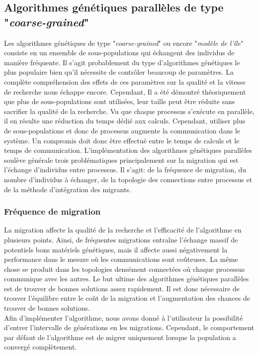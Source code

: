 \documentclass[12pt,a4paper]{article}
\begin{document}
	\newpage	
	
	\subsection{Algorithmes génétiques parallèles de type "\emph{coarse-grained}"}
	Les algorithmes génétiques de type "\emph{coarse-grained}" ou encore "\emph{modèle de l'île}" consiste en un ensemble de sous-populations qui échangent des individus de manière fréquente. Il s'agit probablement du type d'algorithmes génétiques le plus populaire bien qu'il nécessite de contrôler beaucoup de paramètres. La complète compréhension des effets de ces paramètres sur la qualité et la vitesse de recherche nous échappe encore. Cependant, Il a été démontré théoriquement que plus de sous-populations sont utilisées, leur taille peut être réduite sans sacrifier la qualité de la recherche. Vu que chaque processus s'exécute en parallèle, il en résulte une réduction du temps dédié aux calculs. Cependant, utiliser plus de sous-populations et donc de processus augmente la communication dans le système. Un compromis doit donc être effectué entre le temps de calculs et le temps de communication. L'implémentation des algorithmes génétiques parallèles soulève générale trois problématiques principalement sur la migration qui est l'échange d'individus entre processus. Il s'agit: de la fréquence de migration, du nombre d'individus à échanger, de la topologie des connections entre processus et de la méthode d'intégration des migrants.
	\subsubsection{Fréquence de migration}
	La migration affecte la qualité de la recherche et l'efficacité de l'algorithme en plusieurs points. Ainsi, de fréquentes migrations entraîne l'échange massif de potentiels bons matériels génétiques, mais il affecte aussi négativement la performance dans le mesure où les communications sont coûteuses. La même chose se produit dans les topologies densément connectées où chaque processus communique avec les autres. Le but ultime des algorithmes génétiques parallèles est de trouver de bonnes solutions assez rapidement. Il est donc nécessaire de trouver l'équilibre entre le coût de la migration et l'augmentation des chances de trouver de bonnes solutions. \\
	\hspace*{.5cm} Afin d'implémenter l'algorithme, nous avons donné à l'utilisateur la possibilité d'entrer l'intervalle de générations en les migrations. Cependant, le comportement par défaut de l'algorithme est de migrer uniquement lorsque la population a convergé complètement.  
\end{document}
